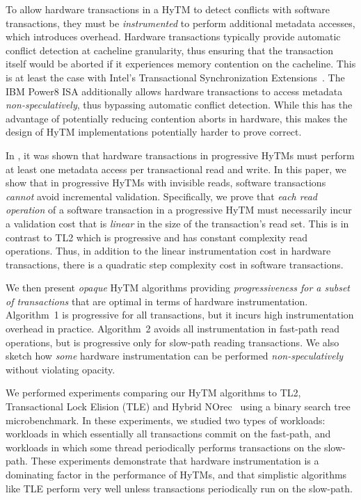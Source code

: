 To allow hardware transactions in a HyTM to detect conflicts with software transactions, they must be \emph{instrumented} to perform additional metadata accesses, which introduces overhead.
Hardware transactions typically provide automatic conflict detection at cacheline granularity,
thus ensuring that the transaction itself would be aborted if it experiences memory contention on the cacheline.
This is at least the case with Intel's Transactional Synchronization Extensions~\cite{haswell}.
The IBM Power8 ISA additionally allows hardware transactions to access metadata \emph{non-speculatively}, 
thus bypassing automatic conflict detection. While this has the advantage of potentially reducing contention aborts
in hardware, this makes the design of HyTM implementations potentially harder to prove correct.

In \cite{htmdisc15}, it was shown that hardware transactions in progressive HyTMs must perform
at least one metadata access per transactional read and write.
In this paper, we show that in progressive HyTMs with invisible reads, 
software transactions \textit{cannot} avoid incremental validation.
Specifically, we prove that \textit{each read operation} of a software transaction in a progressive HyTM
must necessarily incur a validation cost that is \emph{linear} 
in the size of the transaction's read set. 
This is in contrast to TL2 which is progressive and has constant complexity read operations.
Thus, in addition to the linear instrumentation cost in hardware transactions, there is a quadratic step complexity cost in software transactions.

We then present \emph{opaque} HyTM algorithms providing \emph{progressiveness for a subset of transactions} that are  %
optimal in terms of hardware instrumentation.
Algorithm~1 is progressive for all transactions, but it incurs high instrumentation overhead in practice.
Algorithm~2 avoids all instrumentation in fast-path read operations, but is progressive only for slow-path reading transactions.
We also sketch how \emph{some} hardware instrumentation can be performed \textit{non-speculatively} without violating opacity.

We performed experiments comparing our HyTM algorithms to TL2, Transactional Lock Elision (TLE) and Hybrid NOrec~\cite{hynorecriegel} using a binary search tree microbenchmark.
In these experiments, we studied two types of workloads: workloads in which essentially all transactions commit on the fast-path, and workloads in which some thread periodically performs transactions on the slow-path.
These experiments demonstrate that hardware instrumentation is a dominating factor in the performance of HyTMs, and that simplistic algorithms like TLE perform very well unless transactions periodically run on the slow-path.

